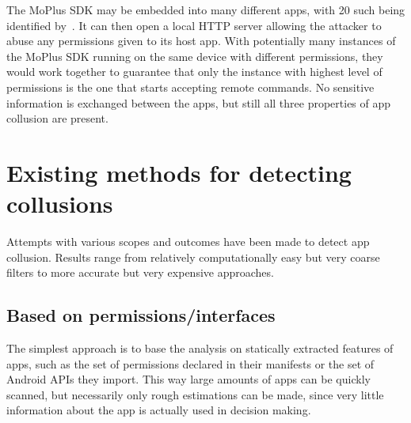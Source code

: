 \documentclass[article, oneside]{aaltoseries}
\begin{document}
The MoPlus SDK may be embedded into many different apps, with 20 such being identified by~\cite{Blasco2016}. It can then open a local HTTP server allowing the attacker to abuse any permissions given to its host app. With potentially many instances of the MoPlus SDK running on the same device with different permissions, they would work together to guarantee that only the instance with highest level of permissions is the one that starts accepting remote commands. No sensitive information is exchanged between the apps, but still all three properties of app collusion are present.

\section{Existing methods for detecting collusions}
\label{sec:approaches}

Attempts with various scopes and outcomes have been made to detect app collusion. Results range from relatively computationally easy but very coarse filters to more accurate but very expensive approaches.

\subsection{Based on permissions/interfaces}
\label{sec:filter}

The simplest approach is to base the analysis on statically extracted features of apps, such as the set of permissions declared in their manifests or the set of Android APIs they import. This way large amounts of apps can be quickly scanned, but necessarily only rough estimations can be made, since very little information about the app is actually used in decision making.
\end{document}
